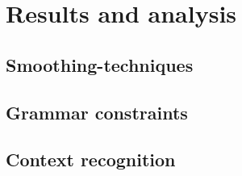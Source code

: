 \section{Results and analysis}
\lipsum[2-3]
\subsection{Smoothing-techniques}
\lipsum[2-3]
\subsection{Grammar constraints}
\lipsum[2-3]
\subsection{Context recognition}
\lipsum[2-3]